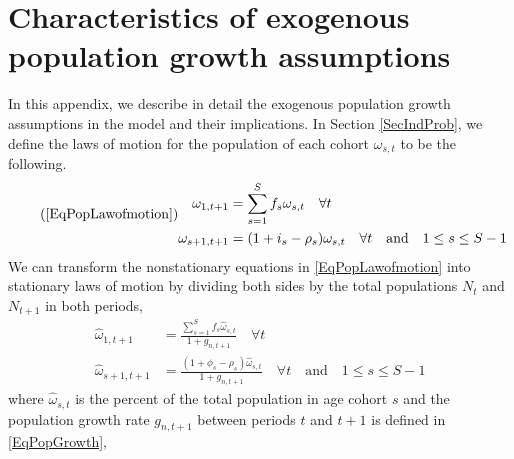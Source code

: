 \documentclass[letterpaper,12pt]{article}
\theoremstyle{definition}
\begin{document}
\newpage
\section{Characteristics of exogenous population growth assumptions}\label{AppPopGrowth}

  \setcounter{equation}{0}

  In this appendix, we describe in detail the exogenous population growth assumptions in the model and their implications. In Section \ref{SecIndProb}, we define the laws of motion for the population of each cohort $\omega_{s,t}$ to be the following.
  \begin{equation}\tag{\ref{EqPopLawofmotion}}
    \begin{split}
      \omega_{1,t+1} &= \sum_{s=1}^S f_s\omega_{s,t}\quad\forall t \\
      \omega_{s+1,t+1} &= (1 + i_s - \rho_s)\omega_{s,t}\quad\forall t\quad\text{and}\quad 1\leq s \leq S-1
    \end{split}
  \end{equation}
  We can transform the nonstationary equations in \eqref{EqPopLawofmotion} into stationary laws of motion by dividing both sides by the total populations $N_t$ and $N_{t+1}$ in both periods,
  \begin{equation}\label{EqPopLawofmotionStat}
    \begin{split}
      \hat{\omega}_{1,t+1} &= \frac{\sum_{s=1}^S f_s\hat{\omega}_{s,t}}{1+g_{n,t+1}}\quad\forall t \\
      \hat{\omega}_{s+1,t+1} &= \frac{(1 + \phi_s - \rho_s)\hat{\omega}_{s,t}}{1+g_{n,t+1}}\quad\forall t\quad\text{and}\quad 1\leq s \leq S-1
    \end{split}
  \end{equation}
  where $\hat{\omega}_{s,t}$ is the percent of the total population in age cohort $s$ and the population growth rate $g_{n,t+1}$ between periods $t$ and $t+1$ is defined in \eqref{EqPopGrowth},
\end{document}
